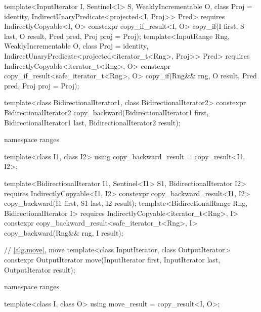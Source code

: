 \begin{addedblock}
\begin{codeblock}
{    template<InputIterator I, Sentinel<I> S, WeaklyIncrementable O, class Proj = identity,
        IndirectUnaryPredicate<projected<I, Proj>> Pred>
      requires IndirectlyCopyable<I, O>
      constexpr copy_if_result<I, O>
        copy_if(I first, S last, O result, Pred pred, Proj proj = Proj{});
    template<InputRange Rng, WeaklyIncrementable O, class Proj = identity,
        IndirectUnaryPredicate<projected<iterator_t<Rng>, Proj>> Pred>
      requires IndirectlyCopyable<iterator_t<Rng>, O>
      constexpr copy_if_result<safe_iterator_t<Rng>, O>
        copy_if(Rng&& rng, O result, Pred pred, Proj proj = Proj{});
  }
\end{codeblock}\end{addedblock}\begin{codeblock}
  template<class BidirectionalIterator1, class BidirectionalIterator2>
    constexpr BidirectionalIterator2
      copy_backward(BidirectionalIterator1 first, BidirectionalIterator1 last,
                    BidirectionalIterator2 result);
\end{codeblock}\begin{addedblock}\begin{codeblock}
  namespace ranges {
    template<class I1, class I2>
    using copy_backward_result = copy_result<I1, I2>;

    template<BidirectionalIterator I1, Sentinel<I1> S1, BidirectionalIterator I2>
      requires IndirectlyCopyable<I1, I2>
      constexpr copy_backward_result<I1, I2>
        copy_backward(I1 first, S1 last, I2 result);
    template<BidirectionalRange Rng, BidirectionalIterator I>
      requires IndirectlyCopyable<iterator_t<Rng>, I>
      constexpr copy_backward_result<safe_iterator_t<Rng>, I>
        copy_backward(Rng&& rng, I result);
  }
\end{codeblock}\end{addedblock}\begin{codeblock}

  // \ref{alg.move}, move
  template<class InputIterator, class OutputIterator>
    constexpr OutputIterator move(InputIterator first, InputIterator last,
                                  OutputIterator result);
\end{codeblock}\begin{addedblock}\begin{codeblock}
  namespace ranges {
    template<class I, class O>
    using move_result = copy_result<I, O>;

}
\end{codeblock}
\end{addedblock}

